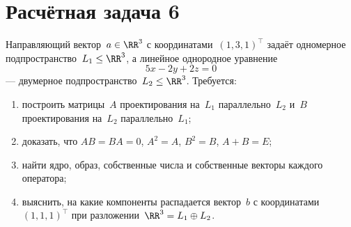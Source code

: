 \section{Расчётная задача 6}

Направляющий вектор~$a \in \RR^3$ с координатами~$(1, 3, 1)^\top$ задаёт одномерное подпространство~$L_1 \leq \RR^3$, а линейное однородное уравнение
\[
	5x - 2y + 2z = 0
\]
--- двумерное подпространство~$L_2 \leq \RR^3$. Требуется:
\begin{enumerate}[1)]
	\item построить матрицы~$A$ проектирования на~$L_1$ параллельно~$L_2$ и~$B$ проектирования на~$L_2$ параллельно~$L_1$;
	\item доказать, что $AB = BA = 0$, $A^2 = A$, $B^2 = B$, $A + B = E$;
	\item найти ядро, образ, собственные числа и собственные векторы каждого оператора;
	\item выяснить, на какие компоненты распадается вектор~$b$ с координатами $(1, 1, 1)^\top$ при разложении~$\RR^3 = L_1 \oplus L_2$.
\end{enumerate}
